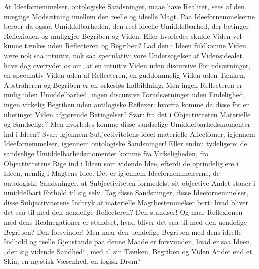 \documentclass[12pt]{book}
\newcommand{\apage}[1]{\marginnote{\footnotesize\textit{[#1]}}}
\begin{document}
At Ideefornemmelser, ontologiske Sandsninger, maae have Realitet, sees af den mægtige
Modsætning imellem den reelle og ideelle Magt. Paa Ideefornemmelserne beroer da ogsaa
Umiddelbarheden, den reel-ideelle Umiddelbarhed, der betinger Reflexionen og muliggjør Begriben
og Viden. Eller hvorledes skulde Viden vel kunne tænkes uden Reflecteren og Begriben? Lad den i
Ideen fuldkomne Viden være nok saa intuitiv, nok saa speculativ: vore Undersøgelser af
Vidensidealet have dog overtydet os om, at en intuitiv Viden uden discursive \apage{393} For\-%
udsætninger, en speculativ Viden uden al Reflecteren, en guddommelig Viden uden Tænken,
Abstraheren og Begriben er en ørkesløs Indbildning. Men ingen Reflecteren er mulig uden
Umiddelbarhed, ingen discursive Forudsætninger uden Endelighed, ingen virkelig Begriben uden
antilogiske Reflexer: hvorfra komme da disse for en ubetinget Viden afgjørende Betingelser?
Svar: fra det i Objectiviteten Materielle og Sandselige? Men hvorledes komme disse sandselige
Umiddelbarhedsmomenter ind i Ideen? Svar: igjennem Subjectivitetens ideel-materielle Affectioner,
igjennem Ideefornemmelser, igjennem ontologiske Sandsninger! Eller endnu tydeligere: de
sandselige Umiddelbarhedsmomenter komme fra Virkeligheden, fra Objectivitetens Rige ind i Ideen
som vidende Idee, efterdi de oprindelig ere i Ideen, nemlig i Magtens Idee. Det er igjennem
Ideefornemmelserne, de ontologiske Sandsninger, at Subjectiviteten formedelst sit objective
Andet staaer i umiddelbart Forhold til sig selv. Tag disse Sandsninger, disse Ideefornemmelser,
disse Subjectivitetens Indtryk af materielle Magtbestemmelser bort: hvad bliver det saa til med
den uendelige Reflecteren? Den standser! Og naar Reflexionen med dens Realnegationer er
standset, hvad bliver det saa til med den uendelige Begriben? Den forsvinder! Men naar den
uendelige Begriben med dens ideelle Indhold og reelle Gjenstande paa denne Maade er forsvunden,
hvad er saa Ideen, „den sig vidende Sandhed“, med al sin Tænken, Begriben og Viden Andet end et
Skin, en mystisk Væsenhed, en logisk Drøm?
\end{document}
